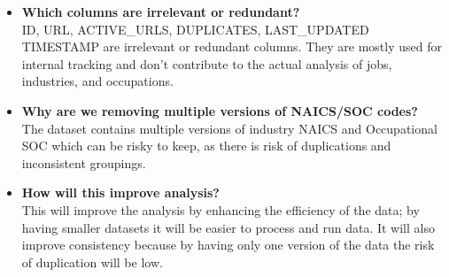\documentclass[
  letterpaper,
  DIV=11,
  numbers=noendperiod]{scrartcl}
\begin{document}
\begin{itemize}
\item
  \textbf{Which columns are irrelevant or redundant?}\\
  ID, URL, ACTIVE\_URLS, DUPLICATES, LAST\_UPDATED TIMESTAMP are
  irrelevant or redundant columns. They are mostly used for internal
  tracking and don't contribute to the actual analysis of jobs,
  industries, and occupations.
\item
  \textbf{Why are we removing multiple versions of NAICS/SOC codes?}\\
  The dataset contains multiple versions of industry NAICS and
  Occupational SOC which can be risky to keep, as there is risk of
  duplications and inconsistent groupings.
\item
  \textbf{How will this improve analysis?}\\
  This will improve the analysis by enhancing the efficiency of the
  data; by having smaller datasets it will be easier to process and run
  data. It will also improve consistency because by having only one
  version of the data the risk of duplication will be low.
\end{itemize}
\end{document}
